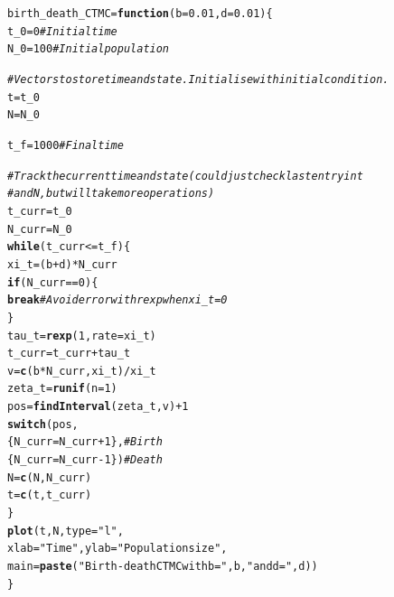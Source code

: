 \documentclass[aspectratio=169]{beamer}\usepackage[]{graphicx}\usepackage[]{xcolor}
\makeatletter
\newcommand{\hlnum}[1]{\textcolor[rgb]{0.686,0.059,0.569}{#1}}%
\newcommand{\hlsng}[1]{\textcolor[rgb]{0.192,0.494,0.8}{#1}}%
\newcommand{\hlcom}[1]{\textcolor[rgb]{0.678,0.584,0.686}{\textit{#1}}}%
\newcommand{\hlopt}[1]{\textcolor[rgb]{0,0,0}{#1}}%
\newcommand{\hldef}[1]{\textcolor[rgb]{0.345,0.345,0.345}{#1}}%
\newcommand{\hlkwa}[1]{\textcolor[rgb]{0.161,0.373,0.58}{\textbf{#1}}}%
\newcommand{\hlkwb}[1]{\textcolor[rgb]{0.69,0.353,0.396}{#1}}%
\newcommand{\hlkwc}[1]{\textcolor[rgb]{0.333,0.667,0.333}{#1}}%
\newcommand{\hlkwd}[1]{\textcolor[rgb]{0.737,0.353,0.396}{\textbf{#1}}}%
\newenvironment{kframe}{%
 \def\at@end@of@kframe{}%
 \ifinner\ifhmode%
  \def\at@end@of@kframe{\end{minipage}}%
  \begin{minipage}{\columnwidth}%
 \fi\fi%
 \def\FrameCommand##1{\hskip\@totalleftmargin \hskip-\fboxsep
 \colorbox{shadecolor}{##1}\hskip-\fboxsep
     \hskip-\linewidth \hskip-\@totalleftmargin \hskip\columnwidth}%
 \MakeFramed {\advance\hsize-\width
   \@totalleftmargin\z@ \linewidth\hsize
   \@setminipage}}%
 {\par\unskip\endMakeFramed%
 \at@end@of@kframe}
\newenvironment{knitrout}{}{} %
\makeatother
\begin{document}
\begin{frame}

\begin{knitrout}
\color{fgcolor}\begin{kframe}
\begin{alltt}
\hldef{birth_death_CTMC} \hlkwb{=} \hlkwa{function}\hldef{(}\hlkwc{b} \hldef{=} \hlnum{0.01}\hldef{,} \hlkwc{d} \hldef{=} \hlnum{0.01}\hldef{) \{}
  \hldef{t_0} \hlkwb{=} \hlnum{0}    \hlcom{# Initial time}
  \hldef{N_0} \hlkwb{=} \hlnum{100}  \hlcom{# Initial population}

  \hlcom{# Vectors to store time and state. Initialise with initial condition.}
  \hldef{t} \hlkwb{=} \hldef{t_0}
  \hldef{N} \hlkwb{=} \hldef{N_0}

  \hldef{t_f} \hlkwb{=} \hlnum{1000}  \hlcom{# Final time}

  \hlcom{# Track the current time and state (could just check last entry in t}
  \hlcom{# and N, but will take more operations)}
  \hldef{t_curr} \hlkwb{=} \hldef{t_0}
  \hldef{N_curr} \hlkwb{=} \hldef{N_0}
  \hlkwa{while} \hldef{(t_curr}\hlopt{<=}\hldef{t_f) \{}
    \hldef{xi_t} \hlkwb{=} \hldef{(b}\hlopt{+}\hldef{d)}\hlopt{*}\hldef{N_curr}
    \hlkwa{if} \hldef{(N_curr} \hlopt{==} \hlnum{0}\hldef{) \{}
      \hlkwa{break} \hlcom{# Avoid error with rexp when xi_t = 0}
    \hldef{\}}
    \hldef{tau_t} \hlkwb{=} \hlkwd{rexp}\hldef{(}\hlnum{1}\hldef{,} \hlkwc{rate} \hldef{= xi_t)}
    \hldef{t_curr} \hlkwb{=} \hldef{t_curr}\hlopt{+}\hldef{tau_t}
    \hldef{v} \hlkwb{=} \hlkwd{c}\hldef{(b}\hlopt{*}\hldef{N_curr, xi_t)}\hlopt{/}\hldef{xi_t}
    \hldef{zeta_t} \hlkwb{=} \hlkwd{runif}\hldef{(}\hlkwc{n} \hldef{=} \hlnum{1}\hldef{)}
    \hldef{pos} \hlkwb{=} \hlkwd{findInterval}\hldef{(zeta_t, v)}\hlopt{+}\hlnum{1}
    \hlkwd{switch}\hldef{(pos,}
           \hldef{\{ N_curr} \hlkwb{=} \hldef{N_curr}\hlopt{+}\hlnum{1}\hldef{\},}  \hlcom{# Birth}
           \hldef{\{ N_curr} \hlkwb{=} \hldef{N_curr}\hlopt{-}\hlnum{1}\hldef{\})} \hlcom{# Death}
    \hldef{N} \hlkwb{=} \hlkwd{c}\hldef{(N, N_curr)}
    \hldef{t} \hlkwb{=} \hlkwd{c}\hldef{(t, t_curr)}
  \hldef{\}}
  \hlkwd{plot}\hldef{(t, N,} \hlkwc{type} \hldef{=} \hlsng{"l"}\hldef{,}
       \hlkwc{xlab} \hldef{=} \hlsng{"Time"}\hldef{,} \hlkwc{ylab} \hldef{=} \hlsng{"Population size"}\hldef{,}
       \hlkwc{main} \hldef{=} \hlkwd{paste}\hldef{(}\hlsng{"Birth-death CTMC with b ="}\hldef{, b,} \hlsng{"and d ="}\hldef{, d))}
\hldef{\}}
\end{alltt}
\end{kframe}
\end{knitrout}

\end{frame}
\end{document}

